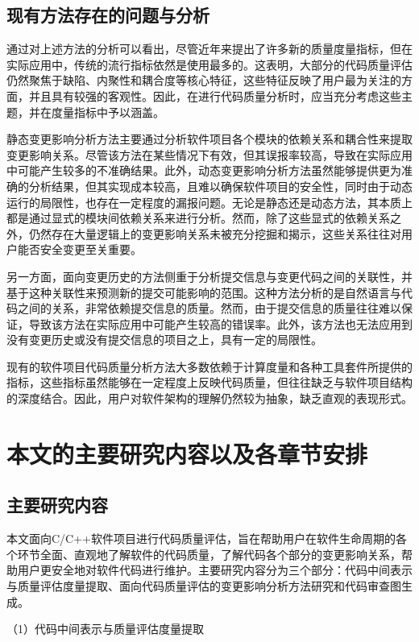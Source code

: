 \subsection{现有方法存在的问题与分析}
通过对上述方法的分析可以看出，尽管近年来提出了许多新的质量度量指标，但在实际应用中，传统的流行指标依然是使用最多的。这表明，大部分的代码质量评估仍然聚焦于缺陷、内聚性和耦合度等核心特征，这些特征反映了用户最为关注的方面，并且具有较强的客观性。因此，在进行代码质量分析时，应当充分考虑这些主题，并在度量指标中予以涵盖。

静态变更影响分析方法主要通过分析软件项目各个模块的依赖关系和耦合性来提取变更影响关系。尽管该方法在某些情况下有效，但其误报率较高，导致在实际应用中可能产生较多的不准确结果。此外，动态变更影响分析方法虽然能够提供更为准确的分析结果，但其实现成本较高，且难以确保软件项目的安全性，同时由于动态运行的局限性，也存在一定程度的漏报问题。无论是静态还是动态方法，其本质上都是通过显式的模块间依赖关系来进行分析。然而，除了这些显式的依赖关系之外，仍然存在大量逻辑上的变更影响关系未被充分挖掘和揭示，这些关系往往对用户能否安全变更至关重要。

另一方面，面向变更历史的方法侧重于分析提交信息与变更代码之间的关联性，并基于这种关联性来预测新的提交可能影响的范围。这种方法分析的是自然语言与代码之间的关系，非常依赖提交信息的质量。然而，由于提交信息的质量往往难以保证，导致该方法在实际应用中可能产生较高的错误率。此外，该方法也无法应用到没有变更历史或没有提交信息的项目之上，具有一定的局限性。

现有的软件项目代码质量分析方法大多数依赖于计算度量和各种工具套件所提供的指标，这些指标虽然能够在一定程度上反映代码质量，但往往缺乏与软件项目结构的深度结合。因此，用户对软件架构的理解仍然较为抽象，缺乏直观的表现形式。



\section{本文的主要研究内容以及各章节安排}
\subsection{主要研究内容}
本文面向C/C++软件项目进行代码质量评估，旨在帮助用户在软件生命周期的各个环节全面、直观地了解软件的代码质量，了解代码各个部分的变更影响关系，帮助用户更安全地对软件代码进行维护。主要研究内容分为三个部分：代码中间表示与质量评估度量提取、面向代码质量评估的变更影响分析方法研究和代码审查图生成。

（1）代码中间表示与质量评估度量提取


